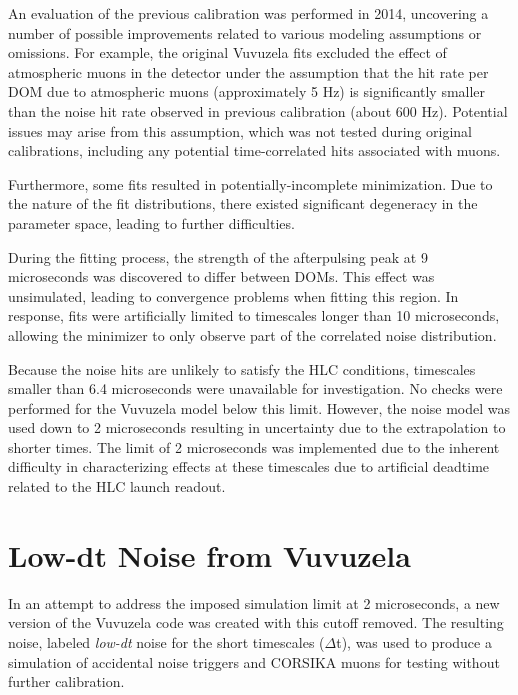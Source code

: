 An evaluation of the previous calibration was performed in 2014, uncovering a number of possible improvements related to various modeling assumptions or omissions.
For example, the original Vuvuzela fits excluded the effect of atmospheric muons in the detector under the assumption that the hit rate per DOM due to atmospheric muons (approximately 5 Hz) is significantly smaller than the noise hit rate observed in previous calibration (about 600 Hz).
Potential issues may arise from this assumption, which was not tested during original calibrations, including any potential time-correlated hits associated with muons.

Furthermore, some fits resulted in potentially-incomplete minimization.
Due to the nature of the fit distributions, there existed significant degeneracy in the parameter space, leading to further difficulties.

During the fitting process, the strength of the afterpulsing peak at 9 microseconds was discovered to differ between DOMs.
This effect was unsimulated, leading to convergence problems when fitting this region.
In response, fits were artificially limited to timescales longer than 10 microseconds, allowing the minimizer to only observe part of the correlated noise distribution.

Because the noise hits are unlikely to satisfy the HLC conditions, timescales smaller than 6.4 microseconds were unavailable for investigation.
No checks were performed for the Vuvuzela model below this limit.
However, the noise model was used down to 2 microseconds resulting in uncertainty due to the extrapolation to shorter times.
The limit of 2 microseconds was implemented due to the inherent difficulty in characterizing effects at these timescales due to artificial deadtime related to the HLC launch readout. 

\section{Low-dt Noise from Vuvuzela}
\label{sec:lowdt_vuvuzela}
In an attempt to address the imposed simulation limit at 2 microseconds, a new version of the Vuvuzela code was created with this cutoff removed.
The resulting noise, labeled \emph{low-dt} noise for the short timescales ($\Delta$t), was used to produce a simulation of accidental noise triggers and CORSIKA muons for testing without further calibration.

